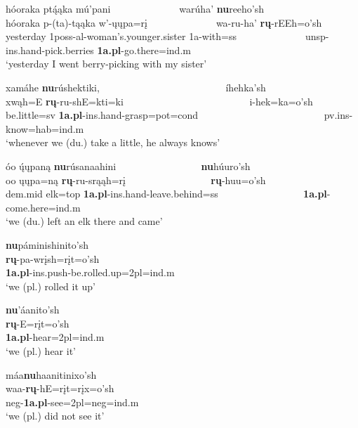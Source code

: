 \begin{exe}
\begin{xlist}
	\item \glll hóoraka ptą́ąka mú'pani ~ ~ ~ ~ ~ ~ ~ ~ warúha' \textbf{nu}reeho'sh\\
	hóoraka p-(ta)-tąąka w'-ųųpa=rį ~ ~ ~ ~ ~ ~ ~ ~ wa-ru-ha' \textbf{rų}-rEEh=o'sh\\
	\textnormal{yesterday} 1poss-al-\textnormal{woman's.younger.sister} 1a-\textnormal{with}=ss ~ ~ ~ ~ ~ ~ ~ ~  unsp-ins.hand-\textnormal{pick.berries} \textbf{1a.pl}-\textnormal{go.there}=ind.m\\
	\glt `yesterday I went berry-picking with my sister' \citep[52]{hollow1973a}
	
	\item \glll xamáhe \textbf{nu}rúshektiki, ~ ~ ~ ~ ~ ~ ~ ~ ~ ~ ~ ~ ~ ~ ~ íhehka'sh\\
	xwąh=E \textbf{rų}-ru-shE=kti=ki ~ ~ ~ ~ ~ ~ ~ ~ ~ ~ ~ ~ ~ ~ ~ i-hek=ka=o'sh\\
	\textnormal{be.little}=sv \textbf{1a.pl}-ins.hand-\textnormal{grasp}=pot=cond ~ ~ ~ ~ ~ ~ ~ ~ ~ ~ ~ ~ ~ ~ ~ pv.ins-\textnormal{know}=hab=ind.m\\
	\glt `whenever we (du.) take a little, he always knows' \citep[116]{hollow1973b}
	\largerpage
	\item \glll óo ų́ųpaną \textbf{nu}rúsanaahini ~ ~ ~ ~ ~ ~ ~ ~ ~ ~ \textbf{nu}húuro'sh\\
	oo ųųpa=ną \textbf{rų}-ru-srąąh=rį ~ ~ ~ ~ ~ ~ ~ ~ ~ ~ \textbf{rų}-huu=o'sh\\
	dem.mid \textnormal{elk}=top \textbf{1a.pl}-ins.hand-\textnormal{leave.behind}=ss ~ ~ ~ ~ ~ ~ ~ ~ ~ ~  \textbf{1a.pl}-\textnormal{come.here}=ind.m\\
	\glt `we (du.) left an elk there and came' \citep[180]{hollow1973b}
	
	\item \glll \textbf{nu}páminishinito'sh\\
	\textbf{rų}-pa-wrįsh=rįt=o'sh\\
	\textbf{1a.pl}-ins.push-\textnormal{be.rolled.up}=2pl=ind.m\\
	\glt `we (pl.) rolled it up' \citep[462]{hollow1970}
	
	\item \glll \textbf{nu}'áanito'sh\\
	\textbf{rų}-E=rįt=o'sh\\
	\textbf{1a.pl}-\textnormal{hear}=2pl=ind.m\\
	\glt `we (pl.) hear it' \citep[473]{hollow1970}
	
	\item \glll máa\textbf{nu}haanitinixo'sh\\
	waa-\textbf{rų}-hE=rįt=rįx=o'sh\\
	neg-\textbf{1a.pl}-\textnormal{see}=2pl=neg=ind.m\\
	\glt `we (pl.) did not see it'
	
	\end{xlist}

\end{exe}

